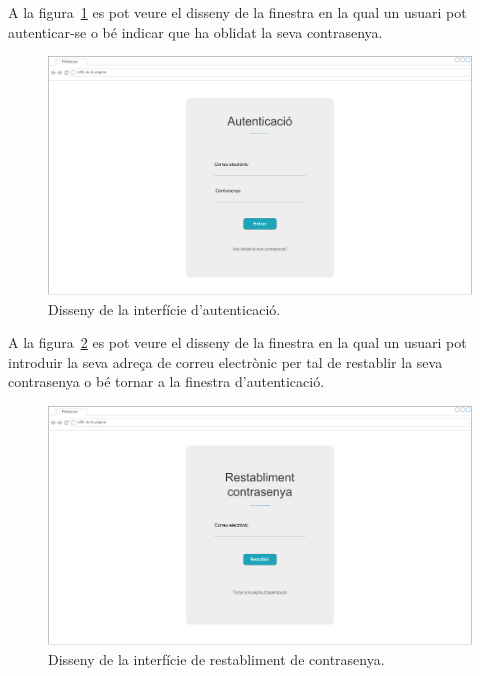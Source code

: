 \documentclass[a4paper,12pt]{ThesisStyle}
\begin{document}
A la figura~\ref{img:login} es pot veure el disseny de la finestra en la qual un usuari pot autenticar-se o bé indicar que ha oblidat la seva contrasenya.
\begin{figure}[H]
	\centering
	\includegraphics[width=\textwidth]{assets/interfaces/auth/login.pdf}
	\caption{\label{img:login}Disseny de la interfície d'autenticació.}
\end{figure}

A la figura~\ref{img:passwordRestablishment} es pot veure el disseny de la finestra en la qual un usuari pot introduir la seva adreça de correu electrònic per tal de restablir la seva contrasenya o bé tornar a la finestra d'autenticació.
\begin{figure}[H]
	\centering
	\includegraphics[width=\textwidth]{assets/interfaces/auth/passwordRestablishment.pdf}
	\caption{\label{img:passwordRestablishment}Disseny de la interfície de restabliment de contrasenya.}
\end{figure}

\newpage
\end{document}
